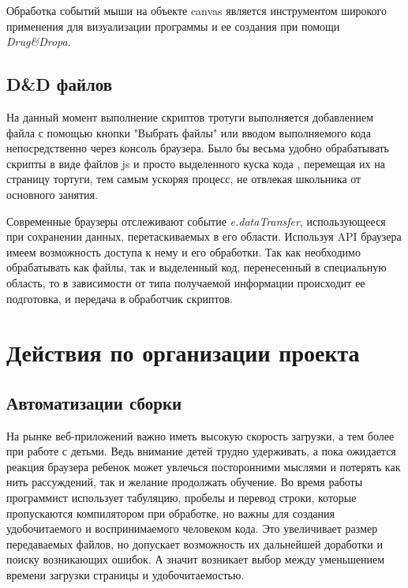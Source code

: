 Обработка событий мыши на объекте canvas является инструментом  широкого применения для визуализации программы и ее создания при помощи \textit{Drug\&Dropa}.



\section{D\&D файлов} \label{sect1_1}
На данный момент выполнение скриптов тротуги выполняется добавлением файла с помощью кнопки "Выбрать файлы" или вводом выполняемого кода непосредственно через консоль браузера.  Было бы весьма удобно обрабатывать скрипты в виде файлов js и просто выделенного куска кода , перемещая их  на страницу тортуги, тем самым ускоряя процесс, не отвлекая школьника от основного занятия.

Современные браузеры отслеживают событие \textit{e.dataTransfer}, использующееся при сохранении данных, перетаскиваемых в его области. Используя API браузера имеем возможность доступа к нему и его обработки. Так как необходимо обрабатывать как файлы, так и выделенный код, перенесенный в специальную область, то в зависимости от типа получаемой информации  происходит ее подготовка, и передача в обработчик скриптов.

\chapter{Действия по организации проекта} \label{chapt1}


\section{Автоматизации сборки} \label{sect1_1}

На рынке веб-приложений важно иметь высокую скорость загрузки, а тем более при работе с детьми. Ведь внимание детей трудно удерживать, а пока ожидается реакция браузера ребенок может увлечься посторонними мыслями и потерять как нить рассуждений, так и желание продолжать обучение. 
Во время работы программист использует табуляцию, пробелы и перевод строки, которые пропускаются компилятором при обработке, но важны для создания удобочитаемого и воспринимаемого человеком кода. Это увеличивает размер передаваемых файлов, но допускает возможность их дальнейшей доработки и поиску возникающих ошибок. А значит возникает выбор между уменьшением времени загрузки страницы и удобочитаемостью.

